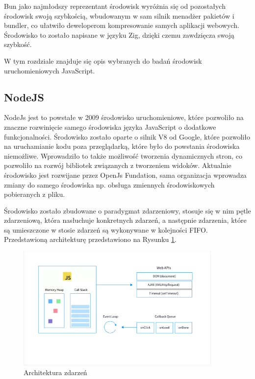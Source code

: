 Bun jako najmłodszy reprezentant środowisk wyróżnia się od pozostałych środowisk swoją szybkością, wbudowanym w sam silnik menadżer pakietów i bundler, co ułatwiło deweloperom kompresowanie samych aplikacji webowych. Środowisko to zostało napisane w języku Zig, dzięki czemu zawdzięcza swoją szybkość.

W tym rozdziale znajduje się opis wybranych do badań środowisk uruchomieniowych JavaScript.

\subsection{NodeJS}
NodeJs jest to powstałe w 2009 środowisko uruchomieniowe, które pozwoliło na znaczne rozwinięcie samego środowiska języka JavaScript o dodatkowe funkcjonalności. Środowisko zostało oparte o silnik V8 od Google, które pozwoliło na uruchamianie kodu poza przeglądarką, które było do powstania środowiska niemożliwe. Wprowadziło to także możliwość tworzenia dynamicznych stron, co pozwoliło na rozwój bibliotek związanych z tworzeniem widoków. Aktualnie środowisko jest rozwijane przez OpenJs Fundation, sama organizacja wprowadza zmiany do samego środowiska np. obsługa zmiennych środowiskowych pobieranych z pliku.

Środowisko zostało zbudowane o paradygmat zdarzeniowy, stosuje się w nim pętle zdarzeniową, która nasłuchuje konkretnych zdarzeń, a następnie zdarzenia, które są umieszczone w stosie zdarzeń są wykonywane w kolejności FIFO. \cite{event_loop} Przedstawioną architekturę przedstawiono na Rysunku \ref{fig:eventLoop}.

\begin{figure}[h]
  \centering
  \includegraphics[width=0.9\textwidth]{Figures/eventLoop.png}
  \caption{Architektura zdarzeń}
  \label{fig:eventLoop}
\end{figure}

